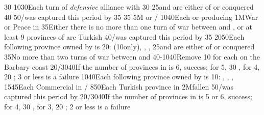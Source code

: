 {}{30}{}%
%
%
{10}{30}{Each turn of \emph{defensive} alliance with \paysmajeurFrance}%
%
%
{}{30}{}%
%
%
{}{25}{\paysvalachie and \paysmoldavie are either \VASSAL of \TUR or
  conquered}%
%
%
%
{}{40}{}%
%
%
{}{50}{\provinceOsterreich/\villeVienne was captured this period by \TUR}%
%
%
{}{35}{}%
%
%
{}{35}{}%
%
\EUobjective5M{ or }{\COL/\TP}%
{10}{40}{Each \COL or \TP producing \POSPICE}%
%
%
\EUobjective1M{War or Peace in \payshongrie}{}%
{}{35}{Either there is no more than one turn of war between \AUSaus and \TUR,
  or at least 9 provinces of \payshongrie are Turkish}%
%
%
{}{40}{\provinceOsterreich/\villeVienne was captured this period by \TUR}%
%
%
{}{35}{}%
%
%
{20}{50}{Each following province owned by \TUR is 20\VPs: \provinceCyclades
  (10\VPs only), \provinceKreta, \provinceMalta, \provinceChypre}%
%
%
{}{25}{\paysvalachie and \paysmoldavie are either \VASSAL of \TUR or
  conquered}%
%
%
%
{}{35}{No more than two turns of war between \AUSaus and \TUR}%
%
%
{40-10}{40}{Remove 10 \VPs for each \Presidio on the Barbary coast}%
%
%
{20/30}{40}{If the number of provinces in \payscrimee is 6, success; for 5, 30
  \VPs, for 4, 20 \VPs; 3 or less is a failure}%
%
%
{10}{40}{Each following province owned by \TUR is 10\VPs: \provinceCorfou,
  \provinceKreta, \provinceMalta, \provinceChypre}%
%
%
{15}{45}{Each Commercial  in \CTZ/\STZ}
%
%
%
{8}{50}{Each Turkish province in \payshongrie}%
%
\EUobjective2M{\villeVienne fallen}{}%
{}{50}{\provinceOsterreich/\villeVienne was captured this period by \TUR}%
%
%
{20/30}{40}{If the number of provinces in \payscrimee is 5 or 6, success; for
  4, 30 \VPs, for 3, 20 \VPs; 2 or less is a failure}%
%
%
